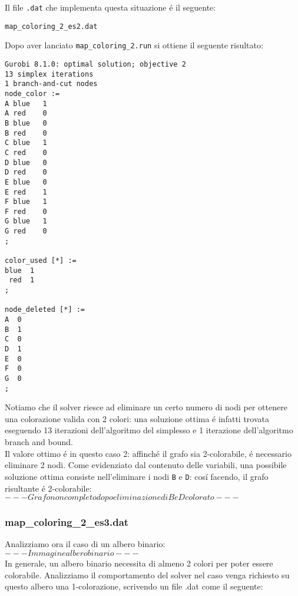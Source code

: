 \documentclass{article}
\begin{document}
Il file \texttt{.dat} che implementa questa situazione \'e il seguente:

\texttt{map\_coloring\_2\_es2.dat}


Dopo aver lanciato \texttt{map\_coloring\_2.run} si ottiene il seguente risultato:\\

\begin{verbatim}
Gurobi 8.1.0: optimal solution; objective 2
13 simplex iterations
1 branch-and-cut nodes
node_color :=
A blue   1
A red    0
B blue   0
B red    0
C blue   1
C red    0
D blue   0
D red    0
E blue   0
E red    1
F blue   1
F red    0
G blue   1
G red    0
;

color_used [*] :=
blue  1
 red  1
;

node_deleted [*] :=
A  0
B  1
C  0
D  1
E  0
F  0
G  0
;

\end{verbatim}

Notiamo che il solver riesce ad eliminare un certo numero di nodi per ottenere una colorazione valida con 2 colori: una soluzione ottima \'e infatti trovata eseguendo 13 iterazioni dell'algoritmo del simplesso e 1 iterazione dell'algoritmo branch and bound.\\
Il valore ottimo \'e in questo caso 2: affinch\'e il grafo sia 2-colorabile, \'e necessario eliminare 2 nodi. Come evidenziato dal contenuto delle variabili, una possibile soluzione ottima consiste nell'eliminare i nodi \texttt{B} e \texttt{D}: cos\'i facendo, il grafo risultante \'e 2-colorabile:\\

$ --- Grafo non completo dopo eliminazione di B e D colorato --- $

\pagebreak

\subsubsection{map\_coloring\_2\_es3.dat}
Analizziamo ora il caso di un albero binario:\\

$ --- Immagine albero binario --- $\\

In generale, un albero binario necessita di almeno 2 colori per poter essere colorabile. Analizziamo il comportamento del solver nel caso venga richiesto su questo albero una 1-colorazione, scrivendo un file .dat come il seguente:\\
\end{document}
